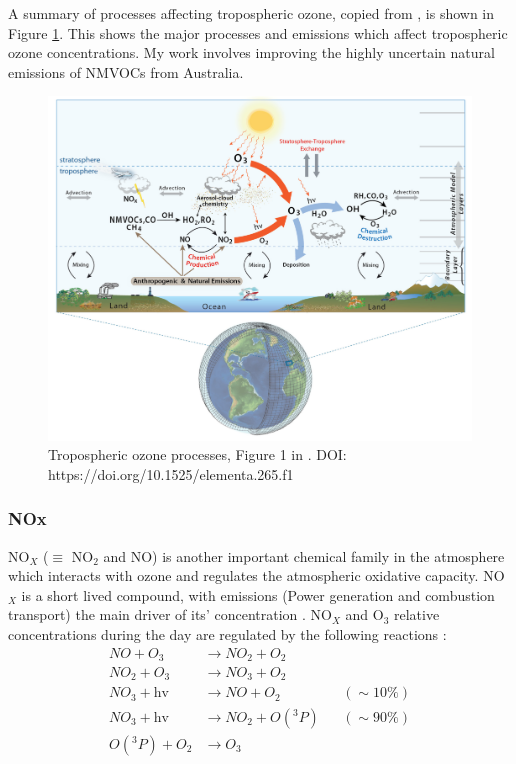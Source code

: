   A summary of processes affecting tropospheric ozone, copied from \cite{Young2018}, is shown in Figure \ref{LR:O3:YoungOzoneSummary}.
  This shows the major processes and emissions which affect tropospheric ozone concentrations.
  My work involves improving the highly uncertain natural emissions of NMVOCs from Australia.
  
  \begin{figure}
    \includegraphics[width=\textwidth]{Figures/Young2018_Figure1.png}
    \caption{%
      Tropospheric ozone processes, Figure 1 in \cite{Young2018}.
      DOI: https://doi.org/10.1525/elementa.265.f1
      }
    \label{LR:O3:YoungOzoneSummary}
  \end{figure}
  
  \subsubsection{NOx}
  NO$_X$ ($\equiv $ NO$_2$ and NO) is another important chemical family in the atmosphere which interacts with ozone and regulates the atmospheric oxidative capacity.
  NO$_X$ is a short lived compound, with emissions (Power generation and combustion transport) the main driver of its' concentration \citep{Delmas1997}.
  NO$_X$ and O$_3$ relative concentrations during the day are regulated by the following reactions \citep{Sillman1999,Atkinson2000}:
  \begin{equation}
    \begin{aligned}
      NO + O_3         & \to NO_2 + O_2      && \\%
      NO_2 + O_3       & \to NO_3 + O_2      && \\%
      NO_3 + \text{hv} & \to NO + O_2        && (\sim 10\%)  \\%
      NO_3 + \text{hv} & \to NO_2 + O({}^3P) && (\sim 90\%)  \\%
      O({}^3P) + O_2   & \to O_3 			 && \\%
    \end{aligned}
    \label{LR:Atmos:Chem:eqn_NOandO3}
  \end{equation}
  
